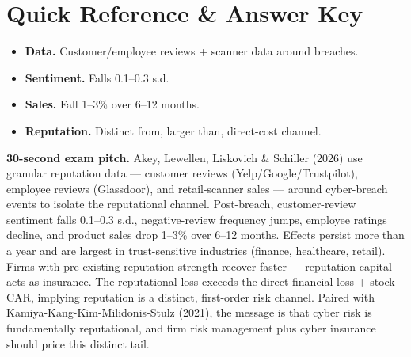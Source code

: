 \documentclass[11pt]{article}
\begin{document}
\section*{Quick Reference \& Answer Key}
\begin{answerbox}
\begin{itemize}
\item \textbf{Data.} Customer/employee reviews + scanner data around breaches.
\item \textbf{Sentiment.} Falls 0.1--0.3 s.d.
\item \textbf{Sales.} Fall 1--3\% over 6--12 months.
\item \textbf{Reputation.} Distinct from, larger than, direct-cost channel.
\end{itemize}
\end{answerbox}

\begin{keybox}
\textbf{30-second exam pitch.} Akey, Lewellen, Liskovich \& Schiller (2026) use granular reputation data --- customer reviews (Yelp/Google/Trustpilot), employee reviews (Glassdoor), and retail-scanner sales --- around cyber-breach events to isolate the reputational channel. Post-breach, customer-review sentiment falls 0.1--0.3 s.d., negative-review frequency jumps, employee ratings decline, and product sales drop 1--3\% over 6--12 months. Effects persist more than a year and are largest in trust-sensitive industries (finance, healthcare, retail). Firms with pre-existing reputation strength recover faster --- reputation capital acts as insurance. The reputational loss exceeds the direct financial loss + stock CAR, implying reputation is a distinct, first-order risk channel. Paired with Kamiya-Kang-Kim-Milidonis-Stulz (2021), the message is that cyber risk is fundamentally reputational, and firm risk management plus cyber insurance should price this distinct tail.
\end{keybox}
\end{document}
